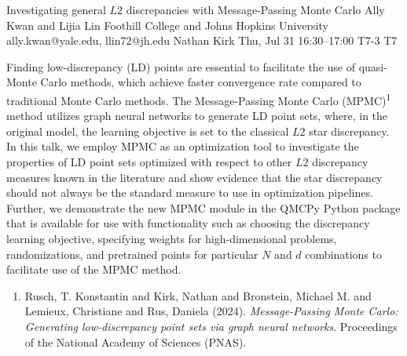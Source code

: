 \begin{talk}
  {Investigating general $L2$ discrepancies with Message-Passing Monte Carlo}%
  {Ally Kwan and Lijia Lin}%
  {Foothill College and Johns Hopkins University}%
  {ally.kwan@yale.edu, llin72@jh.edu}%
  {Nathan Kirk}%
  {}%
  {Thu, Jul 31 16:30--17:00}%
  {T7-3}%
  {T7}%
  {}%
   
Finding low-discrepancy (LD) points are essential to facilitate the use of quasi-Monte Carlo methods, which achieve faster convergence rate compared to traditional Monte Carlo methods. The Message-Passing Monte Carlo (MPMC)\textsuperscript {1} method utilizes graph neural networks to generate LD point sets, where, in the original model, the learning objective is set to the classical $L2$ star discrepancy. In this talk, we employ MPMC as an optimization tool to investigate the properties of LD point sets optimized with respect to other $L2$ discrepancy measures known in the literature and show evidence that the star discrepancy should not always be the standard measure to use in optimization pipelines. Further, we demonstrate the new MPMC module in the QMCPy Python package that is available for use with functionality such as choosing the discrepancy learning objective, specifying weights for high-dimensional problems, randomizations, and pretrained points for particular $N$ and $d$ combinations to facilitate use of the MPMC method.


\begin{enumerate}
 \item[{[1]}] Rusch, T. Konstantin and Kirk, Nathan and Bronstein, Michael M. and Lemieux, Christiane and Rus, Daniela (2024). {\it Message-Passing Monte Carlo: Generating low-discrepancy point sets via graph neural networks}. Proceedings of the National Academy of Sciences (PNAS).

\end{enumerate}

\end{talk}

